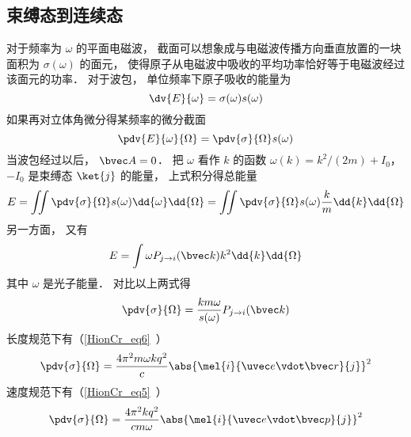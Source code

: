 \subsection{束缚态到连续态}
对于频率为 $\omega$ 的平面电磁波， 截面可以想象成与电磁波传播方向垂直放置的一块面积为 $\sigma(\omega)$ 的面元， 使得原子从电磁波中吸收的平均功率恰好等于电磁波经过该面元的功率． 对于波包， 单位频率下原子吸收的能量为
\begin{equation}
\dv{E}{\omega} = \sigma(\omega) s(\omega)
\end{equation}
如果再对立体角微分得某频率的微分截面 %
\begin{equation}
\pdv{E}{\omega}{\Omega} = \pdv{\sigma}{\Omega} s(\omega)
\end{equation}
当波包经过以后， $\bvec A = 0$． 把 $\omega$ 看作 $k$ 的函数 $\omega(k) = k^2/(2m) + I_0$， $-I_0$ 是束缚态 $\ket{j}$ 的能量， 上式积分得总能量
\begin{equation}
E = \iint \pdv{\sigma}{\Omega} s(\omega) \dd{\omega}\dd{\Omega} = \iint \pdv{\sigma}{\Omega} s(\omega) \frac{k}{m}\dd{k}\dd{\Omega}
\end{equation}
另一方面， 又有
\begin{equation}
E = \int \omega P_{j\to i}(\bvec k) k^2 \dd{k}\dd{\Omega}
\end{equation}
其中 $\omega$ 是光子能量． 对比以上两式得
\begin{equation}
\pdv{\sigma}{\Omega} = \frac{km \omega}{s(\omega)} P_{j\to i}(\bvec k)
\end{equation}
长度规范下有（\autoref{HionCr_eq6}~）
\begin{equation}
\pdv{\sigma}{\Omega} = \frac{4\pi^2 m\omega k q^2}{c} \abs{\mel{i}{\uvec e \vdot\bvec r}{j}}^2
\end{equation}
速度规范下有（\autoref{HionCr_eq5}~）
\begin{equation}\label{SIcros_eq8} %
\pdv{\sigma}{\Omega} = \frac{4\pi^2 k q^2}{c m \omega} \abs{\mel{i}{\uvec e \vdot \bvec p}{j}}^2
\end{equation}

